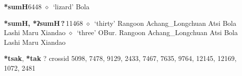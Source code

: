   \begin{list}{}{\leftmargin=1.5em \itemindent=-1.5em}
  \item {\footnotesize \textbf{*sumH}}{\tiny 6448}
         $\diamond$~`lizard'
         Bola 
  \item {\footnotesize \textbf{*sumH, *ʔsumH\,?\,}}{\tiny 11468}
\hspace{1ex}
         $\diamond$~`thirty'
         Rangoon 
\hspace{1ex}
         Achang\_Longchuan 
\hspace{1ex}
         Atsi 
\hspace{1ex}
         Bola 
\hspace{1ex}
         Lashi 
\hspace{1ex}
         Maru 
\hspace{1ex}
         Xiandao 
\hspace{1ex}
         $\diamond$~`three'
         OBur. 
\hspace{1ex}
         Rangoon 
\hspace{1ex}
         Achang\_Longchuan 
\hspace{1ex}
         Atsi 
\hspace{1ex}
         Bola 
\hspace{1ex}
         Lashi 
\hspace{1ex}
         Maru 
\hspace{1ex}
         Xiandao 
  \end{list}
\item
\textbf{*tsak}, \textbf{*tak}
?
  {\tiny crossid 5098, 7478, 9129, 2433, 7467, 7635, 9764, 12145, 12169, 1072, 2481}
